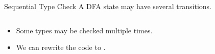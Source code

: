 \newsavebox\typecaseJhbox
\begin{lrbox}{\typecaseJhbox}
  \begin{minipage}{8cm}
    
  \end{minipage}
\end{lrbox}

\newsavebox\typecaseKbox
\begin{lrbox}{\typecaseKbox}
  \begin{minipage}{8cm}
    
  \end{minipage}
\end{lrbox}


\newsavebox\typecaseKhbox
\begin{lrbox}{\typecaseKhbox}
  \begin{minipage}{8cm}
    
  \end{minipage}
\end{lrbox}



\begin{frame}[t]{Sequential Type Check}
  A DFA state may have several  transitions.
  \begin{columns}
    \begin{column}{0.5\textwidth}
      \scalebox{0.9}{}
    \end{column}
    \begin{column}{0.5\textwidth}  %
    \end{column}
  \end{columns}

  \begin{itemize}
  \item<1->{Some types may be checked multiple times.}
  \item<2>{We can rewrite the code to .}
  \end{itemize}

\end{frame}
